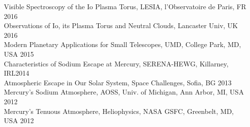 \documentclass[12pt]{report}
\begin{document}
\noindent Visible Spectroscopy of the Io Plasma Torus, LESIA, l'Observatoire de Paris, FR \hfill 2016\\
\noindent Observations of Io, its Plasma Torus and Neutral Clouds, Lancaster Univ, UK \hfill 2016\\
\noindent Modern Planetary Applications for Small Telescopes, UMD, College Park, MD, USA \hfill 2015\\
\noindent Characteristics of Sodium Escape at Mercury, SERENA-HEWG, Killarney, IRL\hfill 2014\\
\noindent Atmospheric Escape in Our Solar System, Space Challenges, Sofia, BG \hfill 2013\\
\noindent Mercury's Sodium Atmosphere, AOSS, Univ. of Michigan, Ann Arbor, MI, USA \hfill 2012\\
\noindent Mercury's Tenuous Atmosphere, Heliophysics, NASA GSFC, Greenbelt, MD, USA \hfill 2012\\
\end{document}
